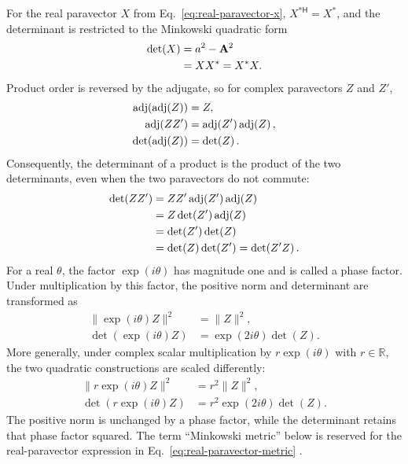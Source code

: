 \documentclass[10pt,letterpaper]{article}
\newcommand{\eqfunc}[1]{\operatorname{#1}}
\newcommand{\R}{\mathbb{R}}
\newcommand{\pv}[1]{#1}
\newcommand{\vct}[1]{\mathbf{#1}}
\newcommand{\Hop}{\mathsf H}
\newcommand{\conj}[1]{#1^{*}}
\newcommand{\cherm}[1]{#1^{*\Hop}}
\newcommand{\detf}[1]{\eqfunc{det}\!\left(#1\right)}
\newcommand{\adjf}[1]{\eqfunc{adj}\!\left(#1\right)}
\begin{document}
For the real paravector \(\pv{X}\) from Eq.\ \eqref{eq:real-paravector-x}, \(\cherm{\pv{X}}=\conj{\pv{X}}\), and the determinant is restricted to the Minkowski quadratic form
\begin{align}
\detf{\pv{X}}
&= a^2-\vct{A}^2\notag\\
&= \pv{X}\conj{\pv{X}}
=\conj{\pv{X}}\pv{X}.
\label{eq:real-paravector-metric}
\end{align}
Product order is reversed by the adjugate, so for complex paravectors \(\pv{Z}\) and \(\pv{Z}'\),
\begin{align}
\adjf{\adjf{\pv{Z}}}&=\pv{Z},\notag\\
\adjf{\pv{Z}\pv{Z}'}
&=\adjf{\pv{Z}'}\adjf{\pv{Z}},\notag\\
\detf{\adjf{\pv{Z}}}&=\detf{\pv{Z}}.
\label{eq:adjugate-identities}
\end{align}
Consequently, the determinant of a product is the product of the two
determinants, even when the two paravectors do not commute:
\begin{align}
\detf{\pv{Z}\pv{Z}'}
&=\pv{Z}\pv{Z}'\adjf{\pv{Z}'}\adjf{\pv{Z}}\notag\\
&=\pv{Z}\detf{\pv{Z}'}\adjf{\pv{Z}}\notag\\
&=\detf{\pv{Z}'}\detf{\pv{Z}}\notag\\
&=\detf{\pv{Z}}\detf{\pv{Z}'}
=\detf{\pv{Z}'\pv{Z}}.
\label{eq:metric-product}
\end{align}
For a real \(\theta\), the factor \(\exp(i\theta)\) has magnitude one and is
called a phase factor. Under multiplication by this factor, the positive norm
and determinant are transformed as
\begin{align*}
\|\exp(i\theta)\pv{Z}\|^2 &= \|\pv{Z}\|^2,\\
\detf{\exp(i\theta)\pv{Z}}
&= \exp(2i\theta)\detf{\pv{Z}}.
\end{align*}
More generally, under complex scalar multiplication by \(r\exp(i\theta)\) with \(r\in\R\), the two quadratic constructions are scaled differently:
\begin{align}
\|r\exp(i\theta)\pv{Z}\|^2 &= r^2\|\pv{Z}\|^2,
\label{eq:norm-scaling}\\
\detf{r\exp(i\theta)\pv{Z}}
&= r^2\exp(2i\theta)\detf{\pv{Z}}.
\label{eq:metric-scaling}
\end{align}
The positive norm is unchanged by a phase factor, while the determinant
retains that phase factor squared. The term ``Minkowski metric'' below is reserved for the
real-paravector expression in Eq.\ \eqref{eq:real-paravector-metric}
\cite{minkowski1908}.
\end{document}
